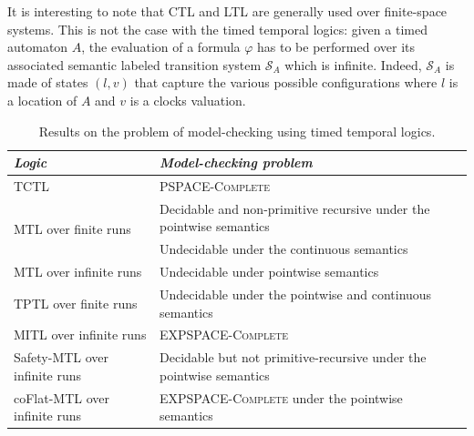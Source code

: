 It is interesting to note that CTL and LTL are generally used over finite-space systems. This is not the case with the timed temporal logics: given a timed automaton $A$, the evaluation of a formula $\varphi$ has to be performed over its associated semantic labeled transition system $\mathcal{S}_A$ which is infinite. Indeed, $\mathcal{S}_A$ is made of states $(l, v)$ that capture the various possible configurations where $l$ is a location of $A$ and $v$ is a clocks valuation.\\

\begin{table}[htbp]
\centering
\footnotesize
\begin{tabular}{|p{3.5cm}|p{9cm}|}

    \hline

    \textit{Logic} &
    \textit{Model-checking problem} \\
    
    \hline
    
    TCTL &
    \textsc{PSPACE-Complete} \cite{AlurCD90,AlurCD93} \\
    
    \hline
    
    \multirow{2}{5cm}{MTL over finite runs} &
    Decidable and non-primitive recursive under the pointwise semantics \cite{OW07} \\
    
    \cline{2--2} &
    Undecidable under the continuous semantics \cite{AlurFH96} \\
    
    \hline
    
    MTL over infinite runs &
    Undecidable under pointwise semantics \cite{OuaknineW06} \\
    
    \hline
    
    TPTL over finite runs &
    Undecidable under the pointwise and continuous semantics \cite{AlurH94} \\
    
    \hline
    
    MITL over infinite runs &
    \textsc{EXPSPACE-Complete} \cite{AlurFH96} \\
    
    \hline
    
    Safety-MTL over infinite runs &
    Decidable but not primitive-recursive under the pointwise semantics \cite{OuaknineW05} \\
    
    \hline
    
    coFlat-MTL over infinite runs &
    \textsc{EXPSPACE-Complete} under the pointwise semantics \cite{BouyerMOW07} \\
    
    \hline
    

\end{tabular}
\caption{Results on the problem of model-checking using timed temporal logics.}
\label{tab:temporal-logics-checking}
\end{table}

